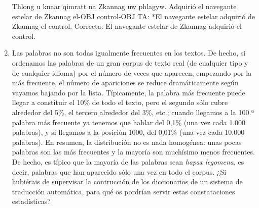 \begin{enumerate}
\begin{example}
\end{example} \begin{example} \gll Thlong u knaar qimratt na Zkannag uw phlagyw. {Adquirió} el navegante estelar de Zkannag el-OBJ control-OBJ \glt TA: *El navegante estelar adquirió de Zkannag el control. \glt Correcta: El navegante estelar de Zkannag adquirió el control. \glend

\end{example} 

\item Las palabras no son todas igualmente frecuentes en los textos. De hecho, si ordenamos las palabras de un gran corpus de texto real (de cualquier tipo y de cualquier idioma) por el número de veces que aparecen, empezando por la más frecuente, el número de apariciones se reduce dramáticamente según vayamos bajando por la lista. Típicamente, la palabra más frecuente puede llegar a constituir el 10\% de todo el texto, pero el segundo sólo cubre alrededor del 5\%, el tercero alrededor del 3\%, etc.; cuando llegamos a la 100.ª palabra más frecuente ya tenemos que hablar del 0,1\% (una vez cada 1.000 palabras), y si llegamos a la posición 1000, del 0,01\% (una vez cada 10.000 palabras). En resumen, la distribución no es nada homogénea: unas pocas palabras son las más frecuentes y la mayoría son muchísimo menos frecuentes. De hecho, es típico que la mayoría de las palabras sean \emph{hapax legomena}, es decir, palabras que han aparecido sólo una vez en todo el corpus. ¿Si hubiérais de supervisar la contrucción de los diccionarios de un sistema de traducción automática, para qué os pordrían servir estas constataciones estadísticas? 


\end{enumerate}
